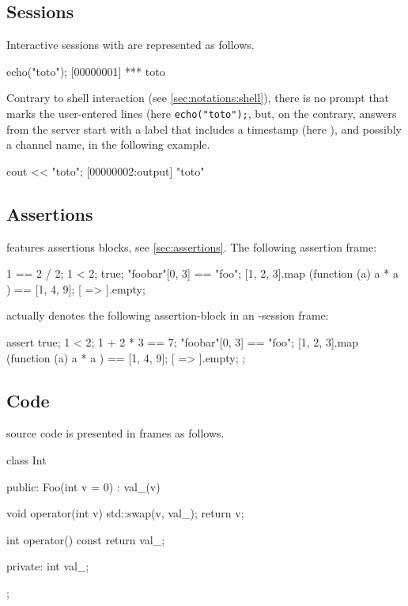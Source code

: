 \subsection{\us Sessions}

Interactive sessions with \urbi are represented as follows.

\begin{urbiscript}[firstnumber=1]
echo("toto");
[00000001] *** toto
\end{urbiscript}

Contrary to shell interaction (see \autoref{sec:notations:shell}),
there is no prompt that marks the user-entered lines (here
\lstinline|echo("toto");|, but, on the contrary, answers from the \urbi
server start with a label that includes a timestamp (here
), and possibly a channel name,  in the
following example.

\begin{urbiscript}
cout << "toto";
[00000002:output] "toto"
\end{urbiscript}


\subsection{\us Assertions}

\us features assertions blocks, see \autoref{sec:assertions}.  The
following assertion frame:

\begin{urbiassert}
1 == 2 / 2;
1 < 2;
true;
"foobar"[0, 3] == "foo";
[1, 2, 3].map (function (a) { a * a }) == [1, 4, 9];
[ => ].empty;
\end{urbiassert}

\noindent
actually denotes the following assertion-block in an \us-session
frame:

\begin{urbiscript}
assert
{
  true;
  1 < 2;
  1 + 2 * 3 == 7;
  "foobar"[0, 3] == "foo";
  [1, 2, 3].map (function (a) { a * a }) == [1, 4, 9];
  [ => ].empty;
};
\end{urbiscript}

\subsection{\Cxx Code}

\Cxx source code is presented in frames as follows.

\begin{cxx}
class Int
{
public:
  Foo(int v = 0)
    : val_(v)
  {}

  void operator(int v)
  {
    std::swap(v, val_);
    return v;
  }

  int operator() const
  {
    return val_;
  }

private:
  int val_;
};
\end{cxx}

